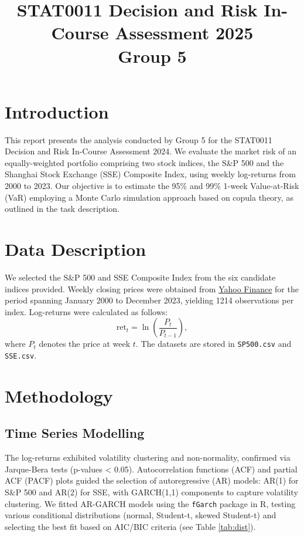 \documentclass[a4paper,10pt]{article}
\title{STAT0011 Decision and Risk In-Course Assessment 2025 \\ Group 5}
\author{}
\begin{document}
\maketitle

\section{Introduction}
This report presents the analysis conducted by Group 5 for the STAT0011 Decision and Risk In-Course Assessment 2024. We evaluate the market risk of an equally-weighted portfolio comprising two stock indices, the S\&P 500 and the Shanghai Stock Exchange (SSE) Composite Index, using weekly log-returns from 2000 to 2023. Our objective is to estimate the 95\% and 99\% 1-week Value-at-Risk (VaR) employing a Monte Carlo simulation approach based on copula theory, as outlined in the task description.

\section{Data Description}
We selected the S\&P 500 and SSE Composite Index from the six candidate indices provided. Weekly closing prices were obtained from \href{https://finance.yahoo.com}{Yahoo Finance} for the period spanning January 2000 to December 2023, yielding 1214 observations per index. Log-returns were calculated as follows:
\[
\text{ret}_t = \ln\left(\frac{P_t}{P_{t-1}}\right),
\]
where $P_t$ denotes the price at week $t$. The datasets are stored in \texttt{SP500.csv} and \texttt{SSE.csv}.

\section{Methodology}
\subsection{Time Series Modelling}
The log-returns exhibited volatility clustering and non-normality, confirmed via Jarque-Bera tests (p-values < 0.05). Autocorrelation functions (ACF) and partial ACF (PACF) plots guided the selection of autoregressive (AR) models: AR(1) for S\&P 500 and AR(2) for SSE, with GARCH(1,1) components to capture volatility clustering. We fitted AR-GARCH models using the \texttt{fGarch} package in R, testing various conditional distributions (normal, Student-t, skewed Student-t) and selecting the best fit based on AIC/BIC criteria (see Table \ref{tab:dist}).
\end{document}
